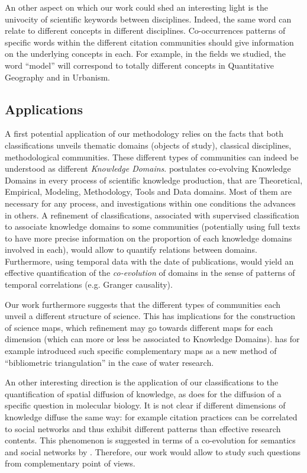 \documentclass[10pt]{article}
\begin{document}
An other aspect on which our work could shed an interesting light is the univocity of scientific keywords between disciplines. Indeed, the same word can relate to different concepts in different disciplines. Co-occurrences patterns of specific words within the different citation communities should give information on the underlying concepts in each. For example, in the fields we studied, the word ``model'' will correspond to totally different concepts in Quantitative Geography and in Urbanism.



\subsection*{Applications}


A first potential application of our methodology relies on the facts that both classifications unveils thematic domains (objects of study), classical disciplines, methodological communities. These different types of communities can indeed be understood as different \emph{Knowledge Domains}. \cite{raimbault2017applied} postulates co-evolving Knowledge Domains in every process of scientific knowledge production, that are Theoretical, Empirical, Modeling, Methodology, Tools and Data domains. Most of them are necessary for any process, and investigations within one conditions the advances in others. A refinement of classifications, associated with supervised classification to associate knowledge domains to some communities (potentially using full texts to have more precise information on the proportion of each knowledge domains involved in each), would allow to quantify relations between domains. Furthermore, using temporal data with the date of publications, would yield an effective quantification of the \emph{co-evolution} of domains in the sense of patterns of temporal correlations (e.g. Granger causality).

Our work furthermore suggests that the different types of communities each unveil a different structure of science. This has implications for the construction of science maps, which refinement may go towards different maps for each dimension (which can more or less be associated to Knowledge Domains). \cite{wen2017mapping} has for example introduced such specific complementary maps as a new method of ``bibliometric triangulation'' in the case of water research.


An other interesting direction is the application of our classifications to the quantification of spatial diffusion of knowledge, as \cite{maisonobe2013diffusion} does for the diffusion of a specific question in molecular biology. It is not clear if different dimensions of knowledge diffuse the same way: for example citation practices can be correlated to social networks and thus exhibit different patterns than effective research contents. This phenomenon is suggested in terms of a co-evolution for semantics and social networks by \cite{roth2010social}. Therefore, our work would allow to study such questions from complementary point of views.
\end{document}
